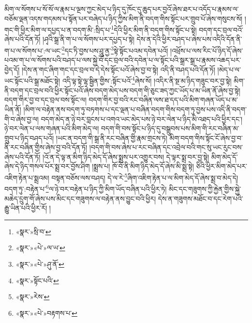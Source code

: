 མིག་ལ་སོགས་པ་སོ་སོ་ལ་རྣམ་པ་ལྔས་ཀྱང་མེད་པ་ཉིད་དུ་ཁོང་དུ་ཆུད་པར་བྱའོ་ཞེས་ཐར་པ་འདོད་པ་རྣམས་ལ་བཅོམ་ལྡན་འདས་གདམས་པ་སྟོན་པར་བཞེད་པ་ཉིད་ཀྱིས་མིག་ནི་བདག་གིས་སྟོང་པར་གྲུབ་པོ་ཞེས་གསུངས་སོ། །གང་གི་ཕྱིར་མིག་ལ་དཔྱད་པ་ན་བདག་མི་:སྲིད་པ་\footnote{«སྣར་»སྲི་བ་}དེའི་ཕྱིར་མིག་ནི་བདག་གིས་སྟོང་པ་སྟེ། བདག་དང་བྲལ་བའོ་ཞེས་པའི་དོན་ཏོ། །ཤྭའི་སྒྲ་ནི་ག་པ་ལ་སོགས་པར་དཔྱད་པ་སྟེ། དེས་ན་དེའི་ཕྱིར་བཤད་པ་ཞེས་པས་འདིའི་དོན་ནི་ག་པ་ལ་སོགས་པ་:ལ་ཡང་\footnote{«སྣར་»«པེ་»ལ་ཡ་}དང་ཏི་བྱས་པས་ཤཱུ་ནྱ་\footnote{«སྣར་»«པེ་»ཤུ་ནོ་}སྟེ་སྟོང་པའམ་དབེན་པའོ། །འཕྲོས་པ་ལས་རིང་པོ་ཉིད་དོ་ཞེས་པའམ་ག་པ་ལ་སོགས་པའི་བཤད་པ་ལས་སྐྱེ་བོ་དང་བྲལ་བའི་དབེན་པ་ལ་སྟོང་པའི་སྒྲར་སྒྲ་པ་རྣམས་འཆད་པར་བྱེད་དོ། །དེས་ན་གང་ཞིག་གང་དང་བྲལ་བ་དེ་དེས་སྟོང་པའོ་ཞེས་བྱ་བ་སྟེ། འདི་ནི་བཤད་པའི་དོན་ཏོ། །མེད་པ་ལ་ཡང་སྟོང་པའི་སྒྲ་མཐོང་སྟེ། འདི་ལྟ་སྟེ་ལྷ་སྦྱིན་གྱིས་:སྟོང་པའོ་\footnote{«སྣར་»སྟོང་པའི་}ཞེས་སོ། །འདིར་ནི་སྔ་མ་ཉིད་གཟུང་བར་བྱ་སྟེ། མིག་ནི་བདག་དང་བྲལ་བའི་ཕྱིར་སྟོང་པའོ་ཞེས་བདག་མེད་པས་བདག་གི་ཅུང་ཟད་ཀྱང་ཡོད་པ་མ་ཡིན་ནོ་ཞེས་བྱ་སྟེ། བདག་གིར་བྱ་བ་དང་བྲལ་བས་སྟོང་ལ། བདག་གིར་བྱ་བའི་རང་བཞིན་ལས་ཐ་དད་པའི་མིག་གཞན་ཡོད་པ་མ་ཡིན་ནོ། །མིག་ལ་བརྟེན་ནས་བདག་ཏུ་བཏགས་པ་དང་ལྡན་པ་བཞིན་བདག་གིས་བདག་ཏུ་བྱས་པས་འདི་ནི་བདག་གི་བ་ཞེས་བྱ་ལ། བདག་མེད་ན་ཉེ་བར་བླངས་པ་འགའ་ཡང་མེད་པས་ཉེ་བར་ལེན་པ་ཉིད་མི་འཐད་པའི་ཕྱིར་དང་། ཉེ་བར་ལེན་པ་ལས་གཞན་པའི་མིག་མེད་ལ། བདག་གི་བས་སྟོང་པ་ཉིད་དུ་བསྒྲུབས་པས་མིག་གི་རང་བཞིན་མ་གྲུབ་པ་ཉིད་བཤད་པའོ། །ཡང་ན་བདག་གི་སྒྲ་ནི་རང་བཞིན་གྱི་རྣམ་གྲངས་ཏེ། མིག་བདག་གིས་སྟོང་ངོ་ཞེས་བྱ་བ་ནི་རང་བཞིན་གྱིས་ཞེས་བྱ་བའི་དོན་ཏོ། །བདག་གི་བས་ཞེས་པ་རང་བཞིན་དང་འབྲེལ་བའི་གང་སུ་ཡང་རུང་བས་ཞེས་པའི་དོན་ཏོ། །འོ་ན་དེ་ལྟ་ན་མིག་ཉིད་མེད་དོ་ཞེས་སྨྲས་པར་འགྱུར་བས། དེ་ལྟར་སྨྲ་བར་བྱ་སྟེ། མིག་མེད་དོ་ཞེས་དེ་ཉིད་གསལ་པོར་སྨྲ་བར་བྱོས་ཤིག །སྨྲས་པ། ཁོ་བོ་ནི་མིག་ཉིད་མེད་དོ་ཞེས་མི་སྨྲ་སྟེ། ཅིའི་ཕྱིར་མིག་མེད་པར་འཇིག་རྟེན་པ་སྨྲའམ། བསྟན་བཅོས་ལས་བཤད། དེ་ལ་རེ་\footnote{«སྣར་»རེས་}ཞིག་འཇིག་རྟེན་པ་ལ་མིག་མེད་དོ་ཞེས་སྨྲ་བ་མེད་དེ། བདག་ཏུ་:བརྟེན་པ་\footnote{«སྣར་»«པེ་»བརྟགས་པ་}ལ་ཉེ་བར་བརྟེན་པ་ཉིད་ཀྱི་མིག་ཡོད་བཞིན་པའི་ཕྱིར་ཏེ། མིང་དང་གཟུགས་ཀྱི་རྐྱེན་གྱིས་སྐྱེ་མཆེད་དྲུག་གོ་ཞེས་པས་མིང་དང་གཟུགས་ལ་བརྟེན་ནས་བྱུང་བའི་ཕྱིར། དེས་ན་གཟུགས་མཐོང་བ་དང་རེག་པའི་རྒྱུ་ཡིན་པའི་ཕྱིར་རོ། །
